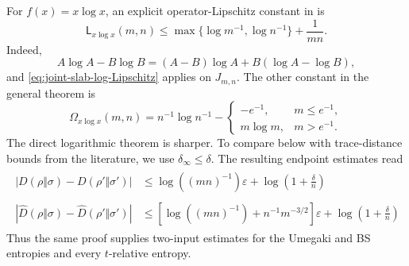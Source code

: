 \documentclass[11pt]{article}
\theoremstyle{remark}
\newcommand{\1}{\mathbbm{1}}
\begin{document}
For $f(x)=x\log x$, an explicit operator-Lipschitz constant in
 is
\begin{equation}
 \mathsf L_{x\log x}(m,n)
 \leq\max\{\log m^{-1},\log n^{-1}\}+\frac1{mn}.
 \label{eq:xlogx-operator-Lipschitz}
\end{equation}
Indeed,
\begin{equation}
 A\log A-B\log B=(A-B)\log A+B(\log A-\log B),
\end{equation}
and \eqref{eq:joint-slab-log-Lipschitz} applies on $J_{m,n}$.  The
other constant in the general theorem is
\begin{equation}
 \Omega_{x\log x}(m,n)
 =n^{-1}\log n^{-1}
 -\begin{cases}
  -e^{-1},&m\leq e^{-1},\\
  m\log m,&m>e^{-1}.
 \end{cases}
 \label{eq:xlogx-oscillation}
\end{equation}
The direct logarithmic theorem is sharper.  To compare below with
trace-distance bounds from the literature, we use
$\delta_\infty\leq\delta$.  The resulting endpoint estimates read
\begin{gather}
 \boxed{\begin{aligned}
 |D(\rho\Vert\sigma)-D(\rho'\Vert\sigma')|
 &\leq\log((mn)^{-1})\varepsilon
 +\log\left(1+\frac{\delta}{n}\right)
 \end{aligned}}
 \label{eq:our-joint-Umegaki-slab}\\
 \boxed{\begin{aligned}
 |\widehat D(\rho\Vert\sigma)
       -\widehat D(\rho'\Vert\sigma')|
 &\leq
 \left[\log((mn)^{-1})+n^{-1}m^{-3/2}\right]\varepsilon
 +\log\left(1+\frac{\delta}{n}\right)
 \end{aligned}}
 \label{eq:our-joint-BS-slab}
\end{gather}
Thus the same proof supplies two-input estimates for the Umegaki and
BS entropies and every $t$-relative entropy.
\end{document}
